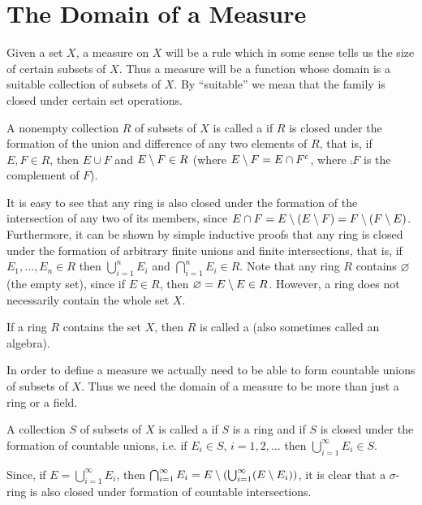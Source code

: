 


\section{The Domain of a Measure}

Given a set $X$, a measure on $X$ will be a rule which in some sense tells us the size of certain subsets of $X$. Thus a measure will be a function whose domain is a suitable collection of subsets of $X$. By ``suitable'' we mean that the family is closed under certain set operations.

\begin{definition}
A nonempty collection $R$ of subsets of $X$ is called a  if $R$ is closed under the formation of the union and difference of any two elements of $R$, that is, if $E,F\in R$, then $E\cup F$ and $E\setminus F\in R$ (where $E\setminus F=E\cap{F}^c$, where $\comp{F}$ is the complement of $F$). 
\end{definition}

It is easy to see that any ring is also closed under the formation of the intersection of any two of its members, since $E\cap F=E\setminus(E\setminus F) = F\setminus (F\setminus E)$. Furthermore, it can be shown by simple inductive proofs that any ring is closed under the formation of arbitrary finite unions and finite intersections, that is, if $E_1,\dots,E_n\in R$ then $\bigcup_{i=1}^nE_i$ and $\bigcap_{i=1}^nE_i\in R$. Note that any ring $R$ contains $\varnothing$ (the empty set), since if $E\in R$, then $\varnothing=E\setminus E\in R$. However, a ring does not necessarily contain the whole set $X$.

\begin{definition}
If a ring $R$ contains the set $X$, then $R$ is called a  (also sometimes called an algebra).
\end{definition}

In order to define a measure we actually need to be able to form countable unions of subsets of $X$. Thus we need the domain of a measure to be more than just a ring or a field.

\begin{definition}
A collection $S$ of subsets of $X$ is called a  if $S$ is a ring and if $S$ is closed under the formation of countable unions, i.e. if $E_i\in S$, $i=1,2,\dots$ then $\bigcup_{i=1}^\infty E_i\in S$.
\end{definition}

Since, if $E=\bigcup_{i=1}^\infty E_i$, then $\bigcap_{i=1}^\infty E_i=E\setminus\left(\bigcup_{i=1}^\infty(E\setminus E_i)\right)$, it is clear that a $\sigma$-ring is also closed under formation of countable intersections.

